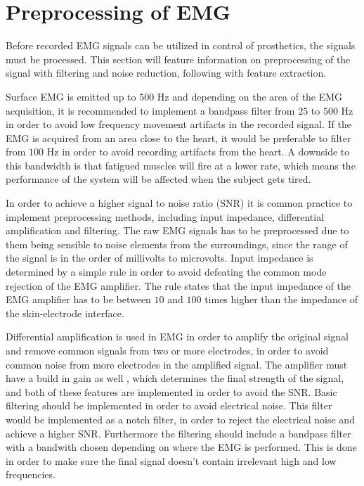 \section{Preprocessing of EMG}

Before recorded EMG signals can be utilized in control of prosthetics, the signals must be processed. This section will feature information on preprocessing of the signal with filtering and noise reduction, following with feature extraction.

Surface EMG is emitted up to $500$ Hz and depending on the area of the EMG acquisition, it is recommended to implement a bandpass filter from $25$ to $500$ Hz in order to avoid low frequency movement artifacts in the recorded signal. If the EMG is acquired from an area close to the heart, it would be preferable to filter from $100$ Hz in order to avoid recording artifacts from the heart. A downside to this bandwidth is that fatigued muscles will fire at a lower rate, which means the performance of the system will be affected when the subject gets tired. \cite{cram2012} %

In order to achieve a higher signal to noise ratio (SNR) it is common practice to implement preprocessing methods, including input impedance, differential amplification and filtering. The raw EMG signals has to be preprocessed due to them being sensible to noise elements from the surroundings, since the range of the signal is in the order of millivolts to microvolts. Input impedance is determined by a simple rule in order to avoid defeating the common mode rejection of the EMG amplifier. The rule states that the input impedance of the EMG amplifier has to be between $10$ and $100$ times higher than the impedance of the skin-electrode interface. \cite{cram2012}

Differential amplification is used in EMG in order to amplify the original signal and remove common signals from two or more electrodes, in order to avoid common noise from more electrodes in the amplified signal. The amplifier must have a build in gain as well , which determines the final strength of the signal, and both of these features are implemented in order to avoid the SNR. Basic filtering should be implemented in order to avoid electrical noise. This filter would be implemented as a notch filter, in order to reject the electrical noise and achieve a higher SNR. Furthermore the filtering should include a bandpass filter with a bandwith chosen depending on where the EMG is performed. This is done in order to make sure the final signal doesn't contain irrelevant high and low frequencies.\cite{cram2012}

